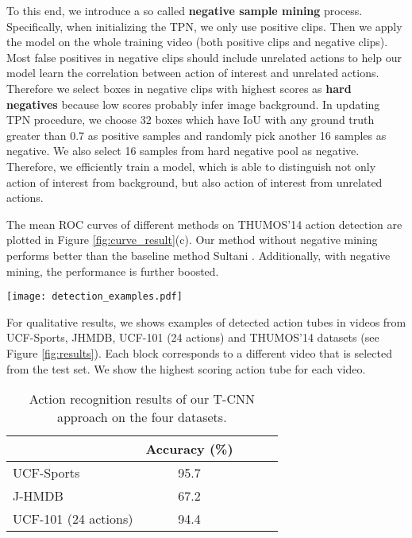 \documentclass[10pt,twocolumn,letterpaper]{article}
\begin{document}
To this end, we introduce a so called \textbf{negative sample mining} process. Specifically, when initializing the TPN, we only use positive clips. Then we apply the model on the whole training video (both positive clips and negative clips). Most false positives in negative clips should include unrelated actions to help our model learn the correlation between action of interest and unrelated actions. Therefore we select boxes in negative clips with highest scores as \textbf{hard negatives} because low scores probably infer image background. In updating TPN procedure, we choose 32 boxes which have IoU with any ground truth greater than 0.7 as positive samples and randomly pick another 16 samples as negative. We also select 16 samples from hard negative pool as negative. Therefore, we efficiently train a model, which is able to distinguish not only action of interest from background, but also action of interest from unrelated actions.

The mean ROC curves of different methods on THUMOS'14 action detection are plotted in Figure \ref{fig:curve_result}(c). Our method without negative mining performs better than the baseline method Sultani \etal \cite{Sultani_2016_CVPR}. Additionally, with negative mining, the performance is further boosted.





\begin{figure*}[!t]
\centering
\texttt{[image: detection\_examples.pdf]}
\caption{Action detection results by T-CNN on UCF-Sports, JHMDB, UCF-101 and THUMOS'14. Red boxes indicate the detections in the corresponding frames, and green boxes denote ground truth. The predicted label is overlaid. }
\label{fig:results}
\end{figure*}

For qualitative results, we shows examples of detected action tubes in videos from UCF-Sports, JHMDB, UCF-101 (24 actions) and THUMOS'14 datasets (see Figure \ref{fig:results}). Each block corresponds to a different video that is selected from the test set. We show the highest scoring action tube for each video.



\begin{table}[!tb]
\begin{center}
\small
\begin{tabular}{lcccc}
\hline
                        & Accuracy (\%)  \\
\hline
UCF-Sports              & 95.7  \\
J-HMDB                  & 67.2       \\
UCF-101 (24 actions)    & 94.4   \\
\hline

\end{tabular}
\caption{Action recognition results of our T-CNN approach on the four datasets.}
\label{tab:rec}
\end{center}
\end{table}
\end{document}
